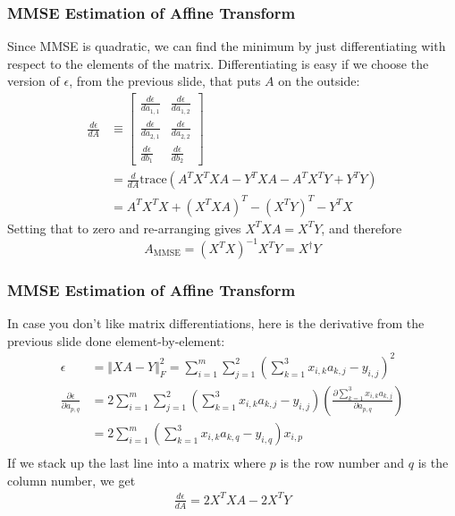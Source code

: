 \documentclass{beamer}
\begin{document}
\begin{frame}
  \frametitle{MMSE Estimation of Affine Transform}

  Since MMSE is quadratic, we can find the minimum by just
  differentiating with respect to the elements of the matrix.
  Differentiating is easy if we choose the version of $\epsilon$, from
  the previous slide, that puts $A$ on the outside:
  \begin{align*}
    \frac{d\epsilon}{dA} &\equiv
    \left[\begin{array}{cc}
        \frac{d\epsilon}{da_{1,1}} &\frac{d\epsilon}{da_{1,2}}\\
        \frac{d\epsilon}{da_{2,1}} &\frac{d\epsilon}{da_{2,2}}\\
        \frac{d\epsilon}{db_{1}} &\frac{d\epsilon}{db_{2}}
      \end{array}\right]\\
    &=\frac{d}{dA} \text{trace}\left(A^TX^TXA-Y^TXA-A^TX^TY+Y^TY\right)\\
    &= A^TX^TX + (X^TXA)^T -(X^TY)^T - Y^TX
  \end{align*}
  Setting that to zero and re-arranging gives $X^TXA=X^TY$, and therefore
  \begin{displaymath}
    A_{\text{MMSE}} = (X^TX)^{-1}X^TY = X^\dag Y
  \end{displaymath}
\end{frame}

\begin{frame}
  \frametitle{MMSE Estimation of Affine Transform}

  In case you don't like matrix differentiations, here is the
  derivative from the previous slide done element-by-element:
  \begin{align*}
    \epsilon &=\Vert XA-Y\Vert_F^2
    =\sum_{i=1}^{m}\sum_{j=1}^2\left(\sum_{k=1}^3x_{i,k}a_{k,j}-y_{i,j}\right)^2\\
    \frac{\partial\epsilon}{\partial a_{p,q}}
    &=2\sum_{i=1}^{m}\sum_{j=1}^2\left(\sum_{k=1}^3x_{i,k}a_{k,j}-y_{i,j}\right)
    \left(\frac{\partial\sum_{k=1}^3x_{i,k}a_{k,j}}{\partial a_{p,q}}\right)\\
    &=2\sum_{i=1}^{m}\left(\sum_{k=1}^3x_{i,k}a_{k,q}-y_{i,q}\right)x_{i,p}\\
  \end{align*}
  If we stack up the last line into a matrix where $p$ is the row
  number and $q$ is the column number, we get
  \begin{align*}
    \frac{d\epsilon}{dA}=2X^TXA -2X^TY
  \end{align*}
\end{frame}
\end{document}
